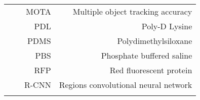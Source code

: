\begin{adjustbox}{max width=\textwidth,left}
\begin{tabular}{@{}rrrr@{}}
        &&MOTA  &        Multiple object tracking accuracy \\ \vspace{2mm}
        &&PDL &          Poly-D Lysine\\ \vspace{2mm}
        &&PDMS  &        Polydimethylsiloxane \\\vspace{2mm}
        &&PBS  &         Phosphate buffered saline \\\vspace{2mm}
        &&RFP &          Red fluorescent protein \\ \vspace{2mm}
        &&R-CNN &        Regions convolutional neural network \\ \vspace{2mm} 
    \end{tabular}
\end{adjustbox}